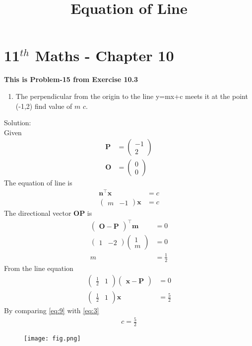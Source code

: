 \documentclass[journel,12pt,twocolumn]{article}
\newcommand{\myvec}[1]{\ensuremath{\begin{pmatrix}#1\end{pmatrix}}}
\let\vec\mathbf
\begin{document}
\begin{center}
\title{\textbf{Equation of Line}}
\date{\vspace{-5ex}} %
\maketitle
\end{center}
\section{11$^{th}$ Maths - Chapter 10}
\textbf{This is Problem-15 from Exercise 10.3}
\begin{enumerate}
\item The perpendicular from the origin to the line y=mx+c meets it at the point (-1,2) find value of $m$ $c$.
\end{enumerate}
Solution:
\\
Given
\begin{align}
\vec{P}&=\myvec{-1\\2}\\
\vec{O}&=\myvec{0\\0}
\end{align}
The equation of line is
\begin{align}
\vec{n}^{\top}\vec{x}&=c\label{eq:3}\\
\myvec{m&-1}\vec{x}&=c
\end{align}
The directional vector $\vec{OP}$ is 
\begin{align}
\myvec{\vec{O}-\vec{P}}^{\top}\vec{m}&=0\\
\myvec{1&-2}\myvec{1\\m}&=0\\
m&=\frac{1}{2}
\end{align}
From the line equation 
\begin{align}
\myvec{\frac{1}{2}&1}\myvec{\vec{x}-\vec{P}}&=0\\
\myvec{\frac{1}{2}&1}\vec{x}&=\frac{5}{2}\label{eq:9}
\end{align}
By comparing \eqref{eq:9} with \eqref{eq:3}
\begin{align}
c=\frac{5}{2}
\end{align}
\begin{figure}[!h]
\centering
\texttt{[image: fig.png]}
\caption{}
  \label{fig:Figure}
\end{figure}
\end{document}
